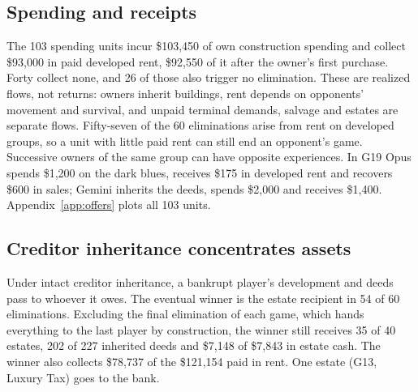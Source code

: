

\subsection{Spending and receipts}

The 103 spending units incur \$103,450 of own construction spending and collect \$93,000 in paid developed rent, \$92,550 of it after the owner's first purchase. Forty collect none, and 26 of those also trigger no elimination. These are realized flows, not returns: owners inherit buildings, rent depends on opponents' movement and survival, and unpaid terminal demands, salvage and estates are separate flows. Fifty-seven of the 60 eliminations arise from rent on developed groups, so a unit with little paid rent can still end an opponent's game. Successive owners of the same group can have opposite experiences. In G19 Opus spends \$1,200 on the dark blues, receives \$175 in developed rent and recovers \$600 in sales; Gemini inherits the deeds, spends \$2,000 and receives \$1,400. Appendix~\ref{app:offers} plots all 103 units.

\subsection{Creditor inheritance concentrates assets}
\label{sec:inheritance}

Under intact creditor inheritance, a bankrupt player's development and deeds pass to whoever it owes. The eventual winner is the estate recipient in 54 of 60 eliminations. Excluding the final elimination of each game, which hands everything to the last player by construction, the winner still receives 35 of 40 estates, 202 of 227 inherited deeds and \$7,148 of \$7,843 in estate cash. The winner also collects \$78,737 of the \$121,154 paid in rent. One estate (G13, Luxury Tax) goes to the bank.

